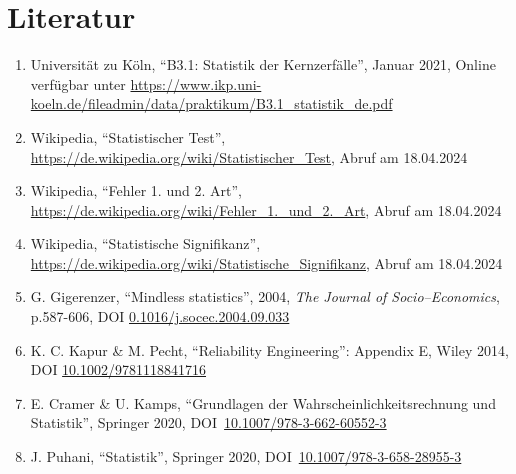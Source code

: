 \documentclass[12pt,a4paper]{scrartcl}
\numberwithin{equation}{section} %
\renewcommand{\[}{} %
\renewcommand{\]}{\noindent} %
\newcommand{\tightlist}{} %
\begin{document}
\clearpage
\hypertarget{literatur}{%
\section{Literatur}\label{literatur}}

\begin{enumerate}
\def\labelenumi{\arabic{enumi}.}
\tightlist
\item
  Universität zu Köln, ``B3.1: Statistik der Kernzerfälle'', Januar
  2021, Online verfügbar unter
  \url{https://www.ikp.uni-koeln.de/fileadmin/data/praktikum/B3.1_statistik_de.pdf}
\item
  Wikipedia, ``Statistischer Test'',
  \url{https://de.wikipedia.org/wiki/Statistischer_Test}, Abruf am
  18.04.2024
\item
  Wikipedia, ``Fehler 1. und 2. Art'',
  \url{https://de.wikipedia.org/wiki/Fehler_1._und_2._Art}, Abruf am
  18.04.2024
\item
  Wikipedia, ``Statistische Signifikanz'',
  \url{https://de.wikipedia.org/wiki/Statistische_Signifikanz}, Abruf am
  18.04.2024
\item
  G. Gigerenzer, ``Mindless statistics'', 2004, \emph{The Journal of
  Socio--Economics}, p.587-606, DOI
  \href{https://doi.org/10.1016/j.socec.2004.09.033}{0.1016/j.socec.2004.09.033}
\item
  K. C. Kapur \& M. Pecht, ``Reliability Engineering'': Appendix E,
  Wiley 2014, DOI
  \href{https://doi.org/10.1002/9781118841716}{10.1002/9781118841716}
\item
  E. Cramer \& U. Kamps, ``Grundlagen der Wahrscheinlichkeitsrechnung
  und Statistik'', Springer 2020, DOI~\href{https://doi.org/10.1007/978-3-662-60552-3}{10.1007/978-3-662-60552-3}
\item
  J. Puhani, ``Statistik'', Springer 2020, DOI~\href{https://doi.org/10.1007/978-3-658-28955-3}{10.1007/978-3-658-28955-3}
\end{enumerate}
\end{document}

